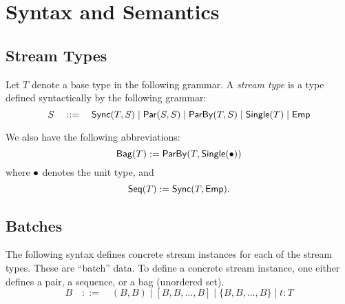 \section{Syntax and Semantics}

\cite{StreamQRE}

\subsection{Stream Types}


\begin{definition}
Let $T$ denote a base type in the following grammar.
A \emph{stream type} is a type defined syntactically by the following grammar:
\[
  S \quad ::= \quad
    \mathsf{Sync}({T}, S) \mid
    \mathsf{Par}({S}, {S}) \mid
    \mathsf{ParBy}({T}, S) \mid
    \mathsf{Single}(T) \mid
    \mathsf{Emp}{}
\]
\end{definition}

We also have the following abbreviations:
\[
  \mathsf{Bag}({T}) := \mathsf{ParBy}({T}, \mathsf{Single}(\bullet{}))
\]
where $\bullet{}$ denotes the unit type, and
\[
  \mathsf{Seq}({T}) := \mathsf{Sync}({T}, \mathsf{Emp}{}).
\]

\subsection{Batches}

The following syntax defines concrete stream instances for each of the
stream types.
These are ``batch'' data.
To define a concrete stream instance, one either defines a pair, a sequence, or a bag (unordered set).
\[
  B \quad ::= \quad
    (B, B) \mid
    [B, B, \ldots, B] \mid
    \{B, B, \ldots, B\} \mid
    t: T
\]

